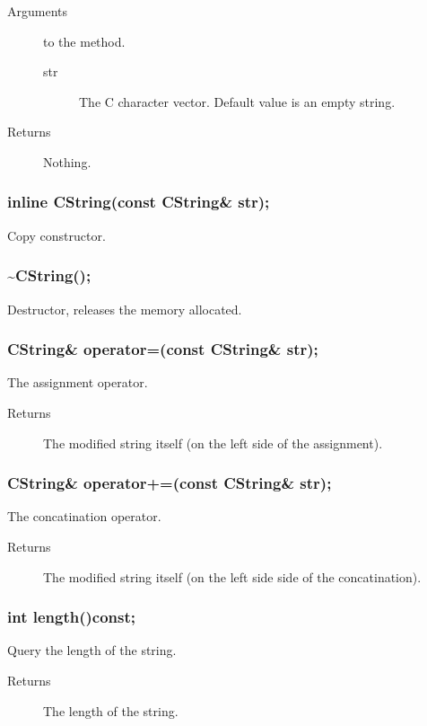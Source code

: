 \begin{description}
 \item [Arguments] to the method.
   \begin{description} 
     \item [str] The C character vector. Default value is an empty string.
   \end{description}
 \item [Returns] Nothing.
\end{description}

\subsubsection{inline CString(const CString\& str);}
Copy constructor.

\subsubsection{\~{ }CString();}
Destructor, releases the memory allocated.

\subsubsection{CString\& operator=(const CString\& str);}
The assignment operator.
\begin{description}
 \item [Returns] The modified string itself (on the left side of the 
                  assignment).
\end{description}

\subsubsection{CString\& operator+=(const CString\& str);}
The concatination operator. 
\begin{description}
 \item [Returns] The modified string itself (on the left side side of the 
                  concatination).
\end{description}

\subsubsection{int length()const;} 
Query the length of the string.
\begin{description}
 \item [Returns] The length of the string.
\end{description}

